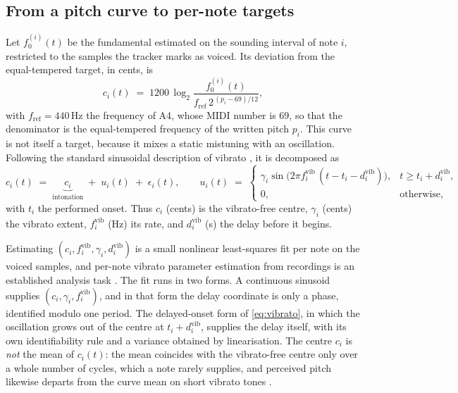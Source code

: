 \subsection{From a pitch curve to per-note targets}
Let $f_0^{(i)}(t)$ be the fundamental estimated on the sounding interval
of note $i$, restricted to the samples the tracker marks as voiced. Its
deviation from the equal-tempered target, in cents, is
\begin{equation}
  c_i(t) \;=\; 1200\,\log_2 \frac{f_0^{(i)}(t)}{f_{\mathrm{ref}}\, 2^{\,(p_i - 69)/12}} ,
  \label{eq:cents-curve}
\end{equation}
with $f_{\mathrm{ref}} = 440$\,Hz the frequency of A4, whose MIDI number
is $69$, so that the denominator is the equal-tempered frequency of the
written pitch $p_i$. This curve is not itself a target, because it mixes
a static mistuning with an oscillation. Following the standard sinusoidal
description of vibrato \cite{seashore1936,prame1994,prame1997}, it is
decomposed as
\begin{equation}
  c_i(t) \;=\; \underbrace{c_i}_{\text{intonation}} \;+\; u_i(t) \;+\; \epsilon_i(t),
  \qquad
  u_i(t) \;=\;
  \begin{cases}
    \gamma_i \sin\!\bigl(2\pi f_i^{\mathrm{vib}}\,(t - t_i - d_i^{\mathrm{vib}})\bigr), & t \ge t_i + d_i^{\mathrm{vib}},\\[2pt]
    0, & \text{otherwise},
  \end{cases}
  \label{eq:vibrato}
\end{equation}
with $t_i$ the performed onset. Thus $c_i$ (cents) is the vibrato-free
centre, $\gamma_i$ (cents) the vibrato extent, $f_i^{\mathrm{vib}}$ (Hz)
its rate, and $d_i^{\mathrm{vib}}$ (s) the delay before it begins.

Estimating $(c_i, f_i^{\mathrm{vib}}, \gamma_i, d_i^{\mathrm{vib}})$ is a
small nonlinear least-squares fit per note on the voiced samples, and
per-note vibrato parameter estimation from recordings is an established
analysis task \cite{driedger2016}. The fit runs in two forms. A continuous
sinusoid supplies $(c_i, \gamma_i, f_i^{\mathrm{vib}})$, and in that form
the delay coordinate is only a phase, identified modulo one period. The
delayed-onset form of \eqref{eq:vibrato}, in which the oscillation grows
out of the centre at $t_i + d_i^{\mathrm{vib}}$, supplies the delay
itself, with its own identifiability rule and a variance obtained by
linearisation. The centre $c_i$ is \emph{not} the mean of $c_i(t)$: the
mean coincides with the vibrato-free centre only over a whole number of
cycles, which a note rarely supplies, and perceived pitch likewise departs
from the curve mean on short vibrato tones \cite{dalessandro1994}.

